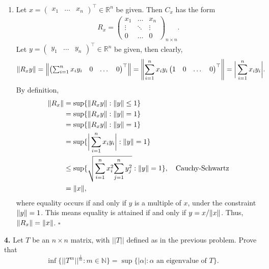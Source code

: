 \documentclass{article}
\begin{document}
\begin{enumerate}
	
	\item  Let ${x} = \begin{pmatrix}
	x_1 & \dots & x_n
	\end{pmatrix}^\top \in \mathbb{R}^n$ be given. Then $C_x$ has the form
	\begin{align*}
	R_x = \begin{pmatrix}
	x_1 & \dots & x_n\\
	\vdots & \ddots  & \vdots\\
	 0 & \dots & 0
	\end{pmatrix}_{n\times n}.
	\end{align*} 
	Let ${y} = \begin{pmatrix}
	y_1 & \dots & y_n
	\end{pmatrix}^\top \in \mathbb{R}^n$ be given, then clearly,
	\begin{align*}
	\norm{ R_xy} &= \norm{ \begin{pmatrix}
	\sum^n_{i=1}x_iy_i & 0 & \dots & 0
	\end{pmatrix}^\top } =  \norm{ \sum^n_{i=1}x_iy_i \begin{pmatrix}
	1 & 0 & \dots & 0
	\end{pmatrix}^\top }= \bigg\vert \sum^n_{i=1}x_i y_i \bigg\vert.
	\end{align*}
	By definition, 
	\begin{align*}
	\norm{R_x} &= \sup \{\norm{R_x y} : \norm{y} \leq 1\}\nonumber\\
	&= \sup \{\norm{R_x y} : \norm{y}  = 1\}\nonumber\\
	&= \sup \{\norm{R_x y} : \norm{y}  = 1\}\nonumber\\
	&= \sup \{ \bigg\vert \sum^n_{i=1}x_i y_i \bigg\vert : \norm{y}  = 1\}\nonumber\\
	&\leq \sup \{ \sqrt{\sum^n_{i=1}x_i^2 {\sum^n_{j=1}y_j^2}} : \norm{y}  = 1\},\quad \text{Cauchy-Schwartz}\nonumber\\
	&= \norm{x} ,
	\end{align*}
	where equality occurs if and only if $y$ is a multiple of $x$, under the constraint $\norm{y}  = 1$. This means equality is attained if and only if $y = x/\norm{x} $. Thus, $\norm{R_x}  = \norm{x} $. \hfill $\square$
\end{enumerate}


\newpage


\noindent \textbf{4.} Let $T$ be an $n \times n$ matrix,  with $||T||$ defined as in the previous problem.   Prove that
$$ \inf \{  || T^m || ^\frac{1}{m} : m \in \mathbb{N} \} = \sup \{ |\alpha| : \alpha \mbox{ an eigenvalue of } T \}. $$
\end{document}
